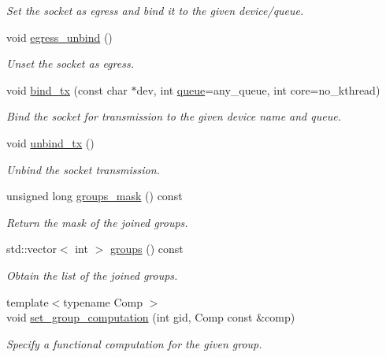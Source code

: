 \begin{DoxyCompactItemize}
\begin{DoxyCompactList}\small\item\em Set the socket as egress and bind it to the given device/queue. \end{DoxyCompactList}\item 
void \hyperlink{classpfq_1_1socket_ae80718e8f26cdaed3fd05bfde6d835e0}{egress\+\_\+unbind} ()
\begin{DoxyCompactList}\small\item\em Unset the socket as egress. \end{DoxyCompactList}\item 
void \hyperlink{classpfq_1_1socket_ae1a9ad5e1d5ad478a1a642f29f49e9c0}{bind\+\_\+tx} (const char $\ast$dev, int \hyperlink{classpfq_1_1queue}{queue}=any\+\_\+queue, int core=no\+\_\+kthread)
\begin{DoxyCompactList}\small\item\em Bind the socket for transmission to the given device name and queue. \end{DoxyCompactList}\item 
void \hyperlink{classpfq_1_1socket_a99ee5e145ccf3a043b3c2aacb3df30cc}{unbind\+\_\+tx} ()
\begin{DoxyCompactList}\small\item\em Unbind the socket transmission. \end{DoxyCompactList}\item 
unsigned long \hyperlink{classpfq_1_1socket_a45c12f4255af4eb74bb9a75d8e1a56eb}{groups\+\_\+mask} () const 
\begin{DoxyCompactList}\small\item\em Return the mask of the joined groups. \end{DoxyCompactList}\item 
std\+::vector$<$ int $>$ \hyperlink{classpfq_1_1socket_a7bb02f670cf9c16b4339f650c7b80de7}{groups} () const 
\begin{DoxyCompactList}\small\item\em Obtain the list of the joined groups. \end{DoxyCompactList}\item 
{\footnotesize template$<$typename Comp $>$ }\\void \hyperlink{classpfq_1_1socket_a5cb37765ffcb1b78c5d61211f9e806df}{set\+\_\+group\+\_\+computation} (int gid, Comp const \&comp)
\begin{DoxyCompactList}\small\item\em Specify a functional computation for the given group. \end{DoxyCompactList}\item 

\end{DoxyCompactItemize}
